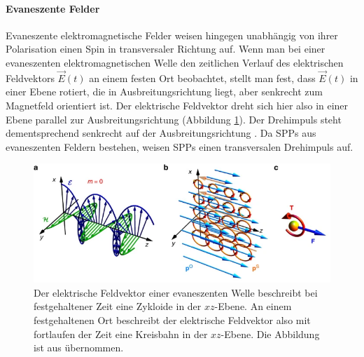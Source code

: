\documentclass[titlepage,  ngerman]{article}
\begin{document}
	\paragraph{Evaneszente Felder}	
	Evaneszente elektromagnetische Felder weisen hingegen unabhängig von ihrer Polarisation einen Spin in transversaler Richtung auf. Wenn man bei einer evaneszenten elektromagnetischen Welle den zeitlichen Verlauf des elektrischen Feldvektors $\vec{E}(t)$ an einem festen Ort beobachtet, stellt man fest, dass $\vec{E}(t)$ in einer Ebene rotiert, die in Ausbreitungsrichtung liegt, aber senkrecht zum Magnetfeld orientiert ist. Der elektrische Feldvektor dreht sich hier also in einer Ebene parallel zur Ausbreitungsrichtung (Abbildung \ref{fig:ev_spin}). Der Drehimpuls steht dementsprechend senkrecht auf der Ausbreitungsrichtung \cite{Bliokh.2014}. Da SPPs aus evaneszenten Feldern bestehen, weisen SPPs einen transversalen Drehimpuls auf. 
	
	\begin{figure}[h]
		\centering
		\includegraphics[width=0.7\linewidth]{figures/spin/ev_spin}
		\caption[Drehimpuls von evaneszenter EM-Welle]{Der elektrische Feldvektor einer evaneszenten Welle beschreibt bei festgehaltener Zeit eine Zykloide in der $xz$-Ebene. An einem festgehaltenen Ort beschreibt der elektrische Feldvektor also mit fortlaufen der Zeit eine Kreisbahn in der $xz$-Ebene. Die Abbildung ist aus \cite{Bliokh.2014} übernommen.}
		\label{fig:ev_spin}
	\end{figure}
\end{document}
